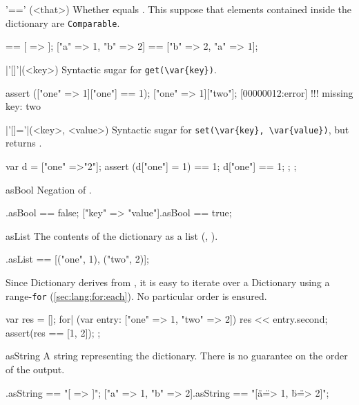 \begin{urbiscriptapi}
\item['=='](<that>)%
  Whether \this equals .  This suppose that elements
  contained inside the dictionary are \lstinline|Comparable|.
\begin{urbiassert}
[ => ] == [ => ];
["a" => 1, "b" => 2] == ["b" => 2, "a" => 1];
\end{urbiassert}


\item|'[]'|(<key>)%
  Syntactic sugar for \lstinline|get(\var{key})|.

\begin{urbiscript}
assert (["one" => 1]["one"] == 1);
["one" => 1]["two"];
[00000012:error] !!! missing key: two
\end{urbiscript}


\item|'[]='|(<key>, <value>)%
  Syntactic sugar for \lstinline|set(\var{key}, \var{value})|, but returns
  .

\begin{urbiscript}
{
  var d = ["one" =>"2"];
  assert
  {
    (d["one"] = 1) == 1;
    d["one"] == 1;
  };
};
\end{urbiscript}


\item[asBool]
  Negation of .
\begin{urbiassert}
[=>].asBool == false;
["key" => "value"].asBool == true;
\end{urbiassert}


\item[asList]%
  The contents of the dictionary as a  list (,
  ).

\begin{urbiassert}
["one" => 1, "two" => 2].asList == [("one", 1), ("two", 2)];
\end{urbiassert}

  \noindent
  Since Dictionary derives from , it is easy
  to iterate over a Dictionary using a range-\lstinline|for|
  (\autoref{sec:lang:for:each}).  No particular order is ensured.
\begin{urbiscript}
{
  var res = [];
  for| (var entry: ["one" => 1, "two" => 2])
    res << entry.second;
  assert(res == [1, 2]);
};
\end{urbiscript}


\item[asString] A string representing the dictionary.  There is no guarantee
  on the order of the output.
\begin{urbiassert}
                [=>].asString == "[ => ]";
["a" => 1, "b" => 2].asString == "[\"a\" => 1, \"b\" => 2]";
\end{urbiassert}


\end{urbiscriptapi}
